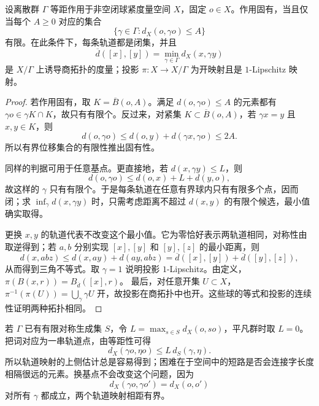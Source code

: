 \begin{proposition}\label{g3:prop:D-proper-orbit-quotient}
	设离散群 \(\Gamma\) 等距作用于非空闭球紧度量空间 \(X\)，固定 \(o\in X\)。作用固有，当且仅当每个 \(A\ge0\) 对应的集合
	\begin{equation}\label{g3:eq:D-bounded-displacement}
		\{\gamma\in\Gamma:d_X(o,\gamma o)\le A\}
	\end{equation}
	有限。在此条件下，每条轨道都是闭集，并且
	\begin{equation}\label{g3:eq:D-quotient-metric}
		\overline d([x],[y])=\min_{\gamma\in\Gamma}d_X(x,\gamma y)
	\end{equation}
	是 \(X/\Gamma\) 上诱导商拓扑的度量；投影 \(\pi:X\to X/\Gamma\) 为开映射且是 \(1\)-Lipschitz 映射。
\end{proposition}
\begin{proof}
	若作用固有，取 \(K=\overline B(o,A)\)。满足 \(d(o,\gamma o)\le A\) 的元素都有 \(\gamma o\in\gamma K\cap K\)，故只有有限个。反过来，对紧集 \(K\subset\overline B(o,A)\)，若 \(\gamma x=y\) 且 \(x,y\in K\)，则
	\[
		d(o,\gamma o)\le d(o,y)+d(\gamma x,\gamma o)\le2A.
	\]
	所以有界位移集合的有限性推出固有性。

	同样的判据可用于任意基点。更直接地，若 \(d(x,\gamma y)\le L\)，则
	\[
		d(o,\gamma o)\le d(o,x)+L+d(y,o),
	\]
	故这样的 \(\gamma\) 只有有限个。于是每条轨道在任意有界球内只有有限多个点，因而闭；求 \(\inf_\gamma d(x,\gamma y)\) 时，只需考虑距离不超过 \(d(x,y)\) 的有限个候选，最小值确实取得。

	更换 \(x,y\) 的轨道代表不改变这个最小值。它为零恰好表示两轨道相同，对称性由取逆得到；若 \(a,b\) 分别实现 \([x],[y]\) 和 \([y],[z]\) 的最小距离，则
	\[
		d(x,abz)\le d(x,ay)+d(ay,abz)
		=\overline d([x],[y])+\overline d([y],[z]),
	\]
	从而得到三角不等式。取 \(\gamma=1\) 说明投影 \(1\)-Lipschitz。由定义，
	\(\pi(B(x,r))=B_{\overline d}([x],r)\)。
	最后，对任意开集 \(U\subset X\)，
	\(\pi^{-1}(\pi(U))=\bigcup_\gamma\gamma U\) 开，故投影在商拓扑中也开。这些球的等式和投影的连续性证明两种拓扑相同。
\end{proof}

若 \(\Gamma\) 已有有限对称生成集 \(S\)，令
\(L=\max_{s\in S}d_X(o,so)\)，平凡群时取 \(L=0\)。把词对应为一串轨道点，由等距性可得
\begin{equation}\label{g3:eq:D-orbit-lipschitz}
	d_X(\gamma o,\eta o)\le L\,d_S(\gamma,\eta).
\end{equation}
所以轨道映射的上侧估计总是容易得到；困难在于空间中的短路是否会连接字长度相隔很远的元素。换基点不会改变这个问题，因为
\[
	d_X(\gamma o,\gamma o')=d_X(o,o')
\]
对所有 \(\gamma\) 都成立，两个轨道映射相距有界。

